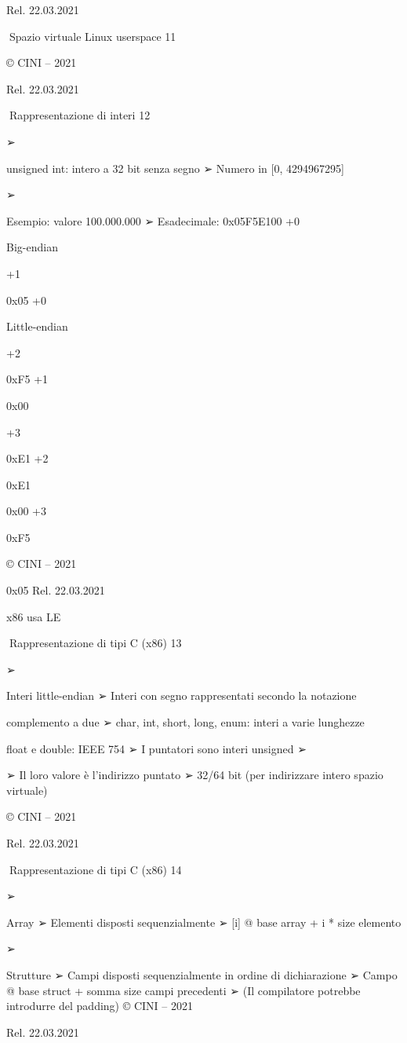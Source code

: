 \documentclass[11pt,a4paper]{article}
\begin{document}
Rel. 22.03.2021

Spazio virtuale Linux userspace 11

© CINI -- 2021

Rel. 22.03.2021

Rappresentazione di interi 12

➢

unsigned int: intero a 32 bit senza segno ➢ Numero in {[}0,
4294967295{]}

➢

Esempio: valore 100.000.000 ➢ Esadecimale: 0x05F5E100 +0

Big-endian

+1

0x05 +0

Little-endian

+2

0xF5 +1

0x00

+3

0xE1 +2

0xE1

0x00 +3

0xF5

© CINI -- 2021

0x05 Rel. 22.03.2021

x86 usa LE

Rappresentazione di tipi C (x86) 13

➢

Interi little-endian ➢ Interi con segno rappresentati secondo la
notazione

complemento a due ➢ char, int, short, long, enum: interi a varie
lunghezze

float e double: IEEE 754 ➢ I puntatori sono interi unsigned ➢

➢ Il loro valore è l'indirizzo puntato ➢ 32/64 bit (per indirizzare
intero spazio virtuale)

© CINI -- 2021

Rel. 22.03.2021

Rappresentazione di tipi C (x86) 14

➢

Array ➢ Elementi disposti sequenzialmente ➢ {[}i{]} @ base array + i *
size elemento

➢

Strutture ➢ Campi disposti sequenzialmente in ordine di dichiarazione ➢
Campo @ base struct + somma size campi precedenti ➢ (Il compilatore
potrebbe introdurre del padding) © CINI -- 2021

Rel. 22.03.2021
\end{document}
